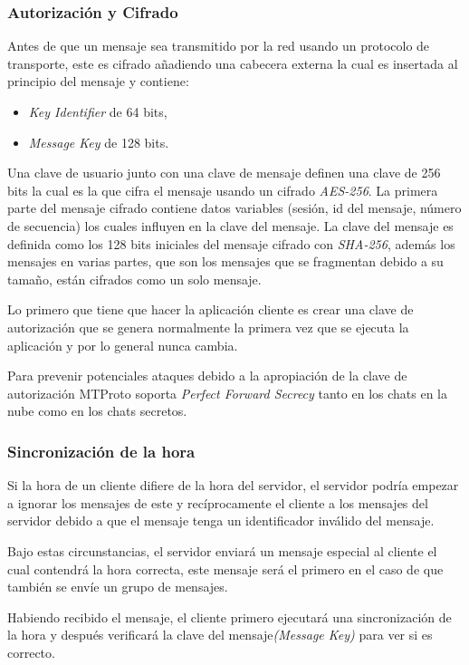 \subsubsection{Autorización y Cifrado}
			Antes de que un mensaje sea transmitido por la red usando un protocolo de transporte, este es cifrado añadiendo una cabecera externa la cual es insertada al principio del mensaje y contiene:
	\begin{itemize}
		\item \emph{Key Identifier} de 64 bits,
		\item \emph{Message Key} de 128 bits.
	\end{itemize}
Una clave de usuario junto con una clave de mensaje definen una clave de 256 bits la cual es la que cifra el mensaje usando un cifrado \emph{AES-256}.
La primera parte del mensaje cifrado contiene datos variables (sesión, id del mensaje, número de secuencia) los cuales influyen en la clave del mensaje. La clave del mensaje es definida como los 128 bits iniciales del mensaje cifrado con \emph{SHA-256}, 
además los mensajes en varias partes, que son los mensajes que se fragmentan debido a su tamaño, están cifrados como un solo mensaje.

Lo primero que tiene que hacer la aplicación cliente es crear una clave de autorización que se genera normalmente la primera vez que se ejecuta la aplicación y por lo general nunca cambia.

Para prevenir potenciales ataques debido a la apropiación de la clave de autorización MTProto soporta \emph{Perfect Forward Secrecy} tanto en los chats en la nube como en los chats secretos.

\subsubsection{Sincronización de la hora}
Si la hora de un cliente difiere de la hora del servidor, el servidor podría empezar a ignorar los mensajes de este y recíprocamente el cliente a los mensajes del servidor debido a que el mensaje tenga un identificador inválido del mensaje.

Bajo estas circunstancias, el servidor enviará un mensaje especial al cliente el cual contendrá la hora correcta, este mensaje será el primero en el caso de que también se envíe un grupo de mensajes.

Habiendo recibido el mensaje, el cliente primero ejecutará una sincronización de la hora y después verificará la clave del mensaje\emph{(Message Key)} para ver si es correcto.

